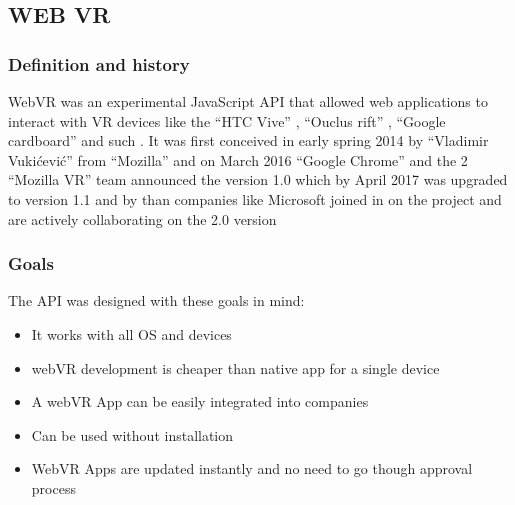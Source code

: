 \documentclass[]{report}
\begin{document}
\subsection{WEB VR}
\subsubsection{Definition and history }
WebVR was an experimental JavaScript API that allowed web applications to
	interact with VR devices like the “HTC Vive” , “Ouclus rift” , “Google
	cardboard” and such . It was first conceived in early spring 2014 by “Vladimir
	Vukićević” from “Mozilla” and on March 2016 “Google Chrome” and the
	2
	“Mozilla VR” team announced the version 1.0 which by April 2017 was
	upgraded to version 1.1 and by than companies like Microsoft joined in on the
	project and are actively collaborating on the 2.0 version \cite{lambo}

\subsubsection{Goals}

The API was designed with these goals in mind:
\begin{itemize}
	
		\item It works with all OS and devices
		\item webVR development is cheaper
		than native app for a single device
		\item A webVR App can be easily
		integrated into companies
		\item Can be used without installation
		\item WebVR Apps are updated instantly
		and no need to go though approval
		process
\end{itemize}
\end{document}
